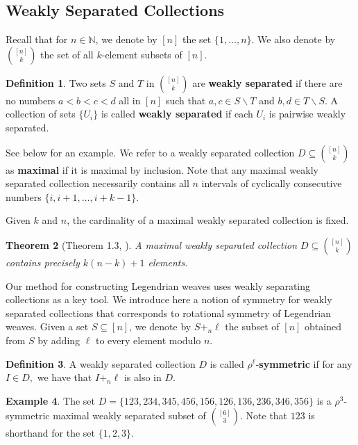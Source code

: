 \documentclass[11pt]{amsart}
\theoremstyle{plain}
\newtheorem{theorem}{Theorem}[section]
\theoremstyle{definition}
\newtheorem{definition}[theorem]{Definition}
\newtheorem{ex}[theorem]{Example}
\begin{document}
\subsection{Weakly Separated Collections}


Recall that for $n \in \mathbb{N}$, we denote by $[n]$ the set $\{1, \dots, n\}$. We also denote by ${[n] \choose k}$ the set of all $k$-element subsets of $[n]$. 


\begin{definition}\label{def:weakly-separated}
Two sets $S$  and $T$  in ${[n] \choose k}$ are \textbf{weakly separated} if there are no numbers $a < b < c < d$ all in $[n]$ such that $a, c \in S \backslash T$ and $b, d \in T \backslash S$. A collection of sets $\{U_i\}$ is called \textbf{weakly separated} if each $U_i$ is pairwise weakly separated.
\end{definition}

See  below for an example.
We refer to a weakly separated collection $D\subseteq {[n]\choose k}$ as \textbf{maximal} if it is maximal by inclusion. Note that any maximal weakly separated collection necessarily contains all $n$ intervals of cyclically consecutive numbers $\{i, i+1, \dots, i+k-1\}$. 




Given $k$ and $n$, the cardinality of a maximal weakly separated collection is fixed.

\begin{theorem}[Theorem 1.3, \cite{OPS2015}]\label{WSC-Size} A maximal weakly separated collection $D\subseteq {[n]\choose k}$ contains precisely $k(n-k)+1$ elements.
\end{theorem}

Our method for constructing Legendrian weaves uses weakly separating collections as a key tool. We introduce here a notion of symmetry for weakly separated collections that corresponds to rotational symmetry of Legendrian weaves. Given a set $S\subseteq [n]$, we denote by $S +_n \ell$ the subset of $[n]$ obtained from $S$ by adding $\ell$ to every element modulo $n$. 
\begin{definition}\label{def:symmetric-ws-collection}
A weakly separated collection $D$ is called $\rho^\ell$-\textbf{symmetric} if
 for any $I\in D,$ we have that $I+_n \ell$ is also in $D$. 
 
\end{definition}



\begin{ex}\label{ex:WSC}
    The set $D=\{123, 234, 345, 456, 156, 126, 136, 236, 346, 356\}$ is a $\rho^3$-symmetric maximal weakly separated subset of ${[6]\choose 3}$. Note that $123$ is shorthand for the set $\{1,2,3\}$. 
\end{ex}
\end{document}
